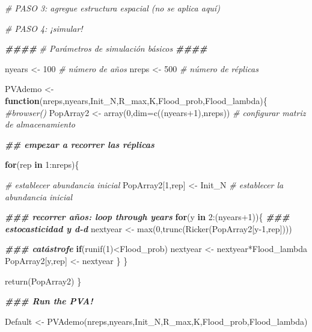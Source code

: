 \documentclass[
]{article}
\newenvironment{Shaded}{\begin{snugshade}}{\end{snugshade}}
\newcommand{\AttributeTok}[1]{\textcolor[rgb]{0.77,0.63,0.00}{#1}}
\newcommand{\CommentTok}[1]{\textcolor[rgb]{0.56,0.35,0.01}{\textit{#1}}}
\newcommand{\ControlFlowTok}[1]{\textcolor[rgb]{0.13,0.29,0.53}{\textbf{#1}}}
\newcommand{\DecValTok}[1]{\textcolor[rgb]{0.00,0.00,0.81}{#1}}
\newcommand{\DocumentationTok}[1]{\textcolor[rgb]{0.56,0.35,0.01}{\textbf{\textit{#1}}}}
\newcommand{\FunctionTok}[1]{\textcolor[rgb]{0.00,0.00,0.00}{#1}}
\newcommand{\NormalTok}[1]{#1}
\newcommand{\OtherTok}[1]{\textcolor[rgb]{0.56,0.35,0.01}{#1}}
\newcommand{\SpecialCharTok}[1]{\textcolor[rgb]{0.00,0.00,0.00}{#1}}
\begin{document}
\begin{Shaded}
\begin{Highlighting}[]
\CommentTok{\# PASO 3: agregue estructura espacial (no se aplica aquí)}

\CommentTok{\# PASO 4: ¡simular!}

\DocumentationTok{\#\#\#\#}
\CommentTok{\# Parámetros de simulación básicos}
\DocumentationTok{\#\#\#\#}

\NormalTok{nyears }\OtherTok{\textless{}{-}} \DecValTok{100}     \CommentTok{\# número de años}
\NormalTok{nreps }\OtherTok{\textless{}{-}} \DecValTok{500}      \CommentTok{\# número de réplicas}


\NormalTok{PVAdemo }\OtherTok{\textless{}{-}} \ControlFlowTok{function}\NormalTok{(nreps,nyears,Init\_N,R\_max,K,Flood\_prob,Flood\_lambda)\{}
  \CommentTok{\#browser()}
\NormalTok{  PopArray2 }\OtherTok{\textless{}{-}} \FunctionTok{array}\NormalTok{(}\DecValTok{0}\NormalTok{,}\AttributeTok{dim=}\FunctionTok{c}\NormalTok{((nyears}\SpecialCharTok{+}\DecValTok{1}\NormalTok{),nreps))   }\CommentTok{\# configurar matriz de almacenamiento}
  
  \DocumentationTok{\#\# empezar a recorrer las réplicas}
  
  \ControlFlowTok{for}\NormalTok{(rep }\ControlFlowTok{in} \DecValTok{1}\SpecialCharTok{:}\NormalTok{nreps)\{}
    
    \CommentTok{\# establecer abundancia inicial}
\NormalTok{    PopArray2[}\DecValTok{1}\NormalTok{,rep] }\OtherTok{\textless{}{-}}\NormalTok{ Init\_N     }\CommentTok{\# establecer la abundancia inicial}
    
    \DocumentationTok{\#\#\# recorrer años: loop through years}
    \ControlFlowTok{for}\NormalTok{(y }\ControlFlowTok{in} \DecValTok{2}\SpecialCharTok{:}\NormalTok{(nyears}\SpecialCharTok{+}\DecValTok{1}\NormalTok{))\{}
      \DocumentationTok{\#\#\# estocasticidad y d{-}d}
\NormalTok{      nextyear }\OtherTok{\textless{}{-}} \FunctionTok{max}\NormalTok{(}\DecValTok{0}\NormalTok{,}\FunctionTok{trunc}\NormalTok{(}\FunctionTok{Ricker}\NormalTok{(PopArray2[y}\DecValTok{{-}1}\NormalTok{,rep])))}
      
      \DocumentationTok{\#\#\# catástrofe}
      \ControlFlowTok{if}\NormalTok{(}\FunctionTok{runif}\NormalTok{(}\DecValTok{1}\NormalTok{)}\SpecialCharTok{\textless{}}\NormalTok{Flood\_prob) nextyear }\OtherTok{\textless{}{-}}\NormalTok{ nextyear}\SpecialCharTok{*}\NormalTok{Flood\_lambda}
\NormalTok{      PopArray2[y,rep] }\OtherTok{\textless{}{-}}\NormalTok{ nextyear }
\NormalTok{    \}}
\NormalTok{  \}}
  
  \FunctionTok{return}\NormalTok{(PopArray2)}
\NormalTok{\}}

\DocumentationTok{\#\#\# Run the PVA!}

\NormalTok{Default }\OtherTok{\textless{}{-}} \FunctionTok{PVAdemo}\NormalTok{(nreps,nyears,Init\_N,R\_max,K,Flood\_prob,Flood\_lambda)}
\end{Highlighting}
\end{Shaded}
\end{document}
